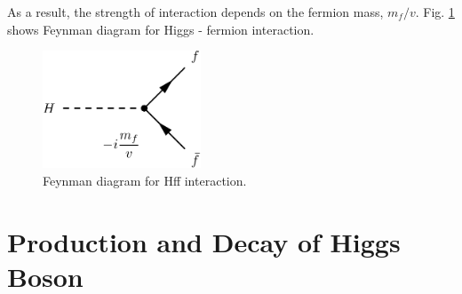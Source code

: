 As a result, the strength of interaction depends on the fermion mass, $m_f / v$. 
Fig. \ref{fig:fd_HFFterm} shows Feynman diagram for Higgs - fermion interaction.    
\begin{figure}[htp]
\centering
\includegraphics[height=3.5cm]{figures/FD_HFFterm.pdf}
\caption{ Feynman diagram for Hff interaction.}
\label{fig:fd_HFFterm}
\end{figure}





\newpage
\section{Production and Decay of Higgs Boson}

